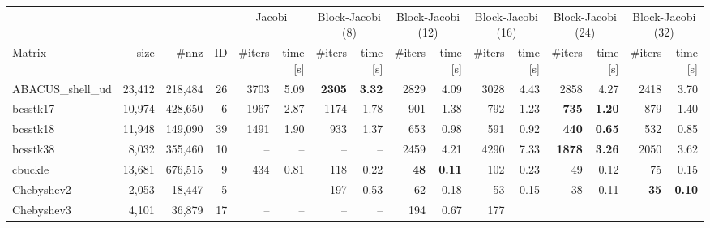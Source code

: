 \begin{landscape}
\begin{table}[p]
\fontsize{7pt}{8pt}\selectfont
\centering
\begin{tabular}{lrrr||rr|rr|rr|rr|rr|rr}
\hline
\hline
& & & & \multicolumn{2}{c|}{Jacobi} & \multicolumn{2}{c|}{Block-Jacobi (8)} &  \multicolumn{2}{c|}{Block-Jacobi (12)}
 & \multicolumn{2}{c|}{Block-Jacobi (16)}  & \multicolumn{2}{c|}{Block-Jacobi (24)} & \multicolumn{2}{c}{Block-Jacobi (32)}\\
 Matrix & size & \#nnz & ID & \#iters & time [s] & \#iters & time [s] & \#iters & time [s] & \#iters & time [s] & \#iters & time [s]  & \#iters & time [s]  \\
\hline
       ABACUS\_shell\_ud  &  23,412  &  218,484  &  26  &     3703 &     5.09  
       & \textbf{    2305} & \textbf{    3.32}  &     2829 &     4.09  &     
       3028 &     4.43  &     2858 &     4.27  &     2418 &     3.70\\
              bcsstk17  &  10,974  &  428,650  &  6  &     1967 &     2.87  
              &     1174 &     1.78  &      901 &     1.38  &      792 &     
              1.23  & \textbf{     735} & \textbf{    1.20}  &      879 &     
              1.40\\
              bcsstk18  &  11,948  &  149,090  &  39  &     1491 &     1.90  
              &      933 &     1.37  &      653 &     0.98  &      591 &     
              0.92  & \textbf{     440} & \textbf{    0.65}  &      532 &     
              0.85\\
              bcsstk38  &  8,032  &  355,460  &  10  &       --  &       --   
              &       --  &       --   &     2459 &     4.21  &     4290 &     
              7.33  & \textbf{    1878} & \textbf{    3.26}  &     2050 &     
              3.62\\
               cbuckle  &  13,681  &  676,515  &  9  &      434 &     0.81  
               &      118 &     0.22  & \textbf{      48} & \textbf{    0.11}  
               &      102 &     0.23  &       49 &     0.12  &       75 &     
               0.15\\
            Chebyshev2  &  2,053  &  18,447  &  5  &       --  &       --   
            &      197 &     0.53  &       62 &     0.18  &       53 &     
            0.15  &       38 &     0.11  & \textbf{      35} & \textbf{    
            0.10}\\
            Chebyshev3  &  4,101  &  36,879  &  17  &       --  &       --   
            &       --  &       --   &      194 &     0.67  &      177 &     

\end{tabular}
\end{table}
\end{landscape}
